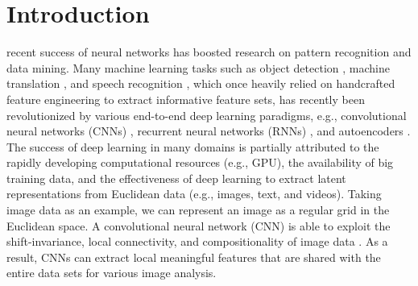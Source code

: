 
	
	
\section{Introduction}\label{sec:introduction}
	
	
	
	

 recent success of neural networks has boosted research on pattern recognition and data mining.  Many machine learning tasks such as object detection \cite{redmon2016you,ren2015faster}, machine translation \cite{luong2015effective,wu2016google}, and speech recognition \cite{hinton2012deep}, which once heavily relied on handcrafted feature engineering to extract informative feature sets, has recently been revolutionized by various end-to-end deep learning paradigms, e.g.,  convolutional neural networks (CNNs) \cite{lecun1995convolutional}, recurrent neural networks (RNNs) \cite{hochreiter1997long}, and autoencoders \cite{vincent2010stacked}. The success of deep learning in many domains is partially attributed to the rapidly developing computational resources (e.g., GPU), the availability of big training data, and the effectiveness of deep learning to extract latent representations from Euclidean data (e.g., images, text, and videos). Taking image data as an example,  we can represent an image as a regular grid in the Euclidean space.  A convolutional neural network (CNN) is able to exploit the shift-invariance, local connectivity, and compositionality of image data \cite{bronstein2017geometric}. As a result, CNNs can extract local meaningful features that are shared with the entire data sets for various image analysis.  
    
